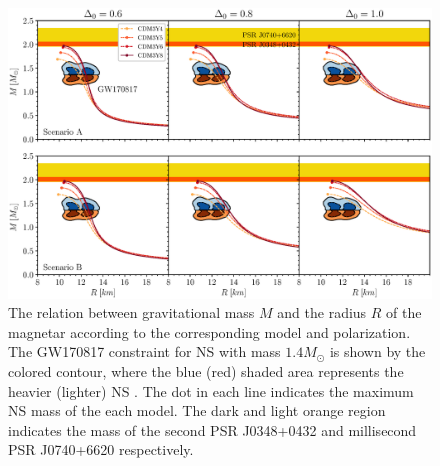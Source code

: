 \begin{figure}[ht!]
        \centering
        \includegraphics[width=\textwidth]{fig/MR.eps}
        \caption{The relation between gravitational mass $M$ and the radius $R$ of the magnetar according to the corresponding model and polarization. The GW170817 constraint for \gls{NS} with mass $1.4M_\odot$ is shown by the colored contour, where the blue (red) shaded area represents the heavier (lighter) \gls{NS} \citep{abbott2018gw170817}. The dot in each line indicates the maximum \gls{NS} mass of the each model. The dark and light orange region indicates the mass of the second \gls{PSR} J0348+0432 \citep{antoniadis2013massive} and millisecond \gls{PSR} J0740+6620 \citep{cromartie2020relativistic} respectively.}
        \label{fig:mr}
\end{figure} 
